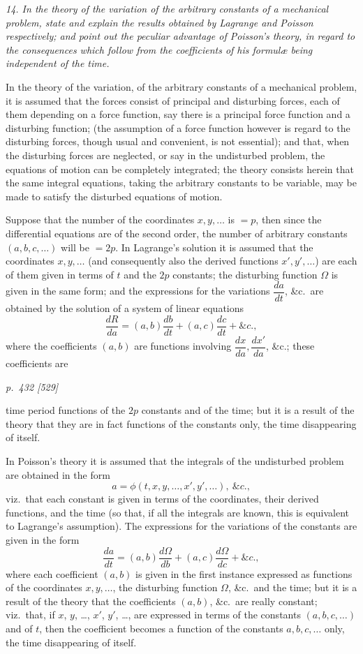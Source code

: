 \documentclass[11pt,a4paper]{article}
\theoremstyle{plain}
\theoremstyle{definition}
\begin{document}
\textit{14. In the theory of the variation of the arbitrary constants of a mechanical problem,
state and explain the results obtained by Lagrange and Poisson respectively; and point
out the peculiar advantage of Poisson's theory, in regard to the consequences which follow
from the coefficients of his formul\ae{} being independent of the time.}

In the theory of the variation, of the arbitrary constants of a mechanical problem,
it is assumed that the forces consist of principal and disturbing forces, each of them
depending on a force function, say there is a principal force function and a disturbing
function; (the assumption of a force function however is regard to the disturbing
forces, though usual and convenient, is not essential); and that, when the disturbing
forces are neglected, or say in the undisturbed problem, the equations of motion can
be completely integrated; the theory consists herein that the same integral equations,
taking the arbitrary constants to be variable, may be made to satisfy the disturbed
equations of motion.

Suppose that the number of the coordinates $x, y, \ldots$ is $= p$, then since the differential
equations are of the second order, the number of arbitrary constants $(a, b, c, \ldots)$ will
be $= 2p$. In Lagrange's solution it is assumed that the coordinates $x, y, \ldots$ (and consequently also the derived functions $x', y', \ldots$) are each of them given in terms of $t$
and the $2p$ constants; the disturbing function $\Omega$ is given in the same form; and
the expressions for the variations $\dfrac{da}{dt}$, \&c.\ are obtained by the solution of a system of linear
equations
\[
\frac{dR}{da} = (a, b)\frac{db}{dt} + (a, c)\frac{dc}{dt} + \&c.,
\]
where the coefficients $(a, b)$ are functions involving $\dfrac{dx}{da}, \dfrac{dx'}{da}$, \&c.; these coefficients are

\clearpage

\bigskip
\textit{p.~432 [529]}
\smallskip

\noindent
time period functions of the $2p$ constants and of the time; but it is a result
of the theory that they are in fact functions of the constants only, the time disappearing of itself.

In Poisson's theory it is assumed that the integrals of the undisturbed problem
are obtained in the form
\[
a = \phi(t, x, y, \ldots, x', y', \ldots),\ \&c.,
\]
viz.\ that each constant is given in terms of the coordinates, their derived functions,
and the time (so that, if all the integrals are known, this is equivalent to Lagrange's
assumption). The expressions for the variations of the constants are given in the form
\[
\frac{da}{dt} = (a, b)\frac{d\Omega}{db} + (a, c)\frac{d\Omega}{dc} + \&c.,
\]
where each coefficient $(a, b)$ is given in the first instance expressed as functions of the coordinates
$x, y, \ldots$, the disturbing function $\Omega$, \&c.\ and the time; but it is a result of the theory
that the coefficients $(a, b)$, \&c.\ are really constant; viz.\ that, if $x$, $y$, \ldots, $x'$, $y'$, \ldots, are
expressed in terms of the constants $(a, b, c, \ldots)$ and of $t$, then the coefficient becomes a function of the constants $a, b, c, \ldots$ only, the time disappearing of itself.
\end{document}

